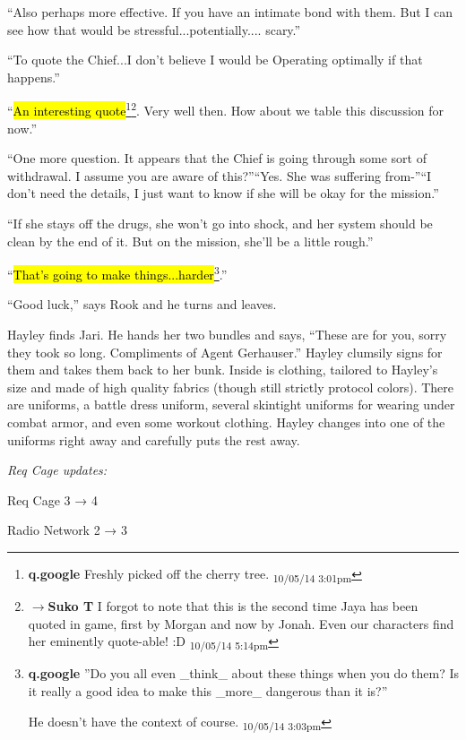 ``Also perhaps more effective.  If you have an intimate bond with them.  But I can see how that would be stressful...potentially.... scary.''

``To quote the Chief...I don't believe I would be Operating optimally if that happens.''

``\hl{An interesting quote}\footnote{\textbf{q.google }Freshly picked off the cherry tree. \textsubscript{10/05/14 3:01pm}}\footnote{$\rightarrow$\textbf{Suko T }I forgot to note that this is the second time Jaya has been quoted in game, first by Morgan and now by Jonah.  Even our characters find her eminently quote-able! :D \textsubscript{10/05/14 5:14pm}}.  Very well then.  How about we table this discussion for now.''

``One more question.  It appears that the Chief is going through some sort of withdrawal.  I assume you are aware of this?''``Yes. She was suffering from-''``I don't need the details, I just want to know if she will be okay for the mission.''

``If she stays off the drugs, she won't go into shock, and her system should be clean by the end of it.  But on the mission, she'll be a little rough.''

``\hl{That's going to make things...harder}\footnote{\textbf{q.google }''Do you all even \_think\_ about these things when you do them?  Is it really a good idea to make this \_more\_ dangerous than it is?''

He doesn't have the context of course. \textsubscript{10/05/14 3:03pm}}.''

``Good luck,'' says Rook and he turns and leaves.





Hayley finds Jari.  He hands her two bundles and says, ``These are for you, sorry they took so long.  Compliments of Agent Gerhauser.''  Hayley clumsily signs for them and takes them back to her bunk.  Inside is clothing, tailored to Hayley's size and made of high quality fabrics (though still strictly protocol colors).  There are uniforms, a battle dress uniform, several skintight uniforms for wearing under combat armor, and even some workout clothing.  Hayley changes into one of the uniforms right away and carefully puts the rest away.



\textit{Req Cage updates:}

Req Cage 3 → 4

Radio Network 2 →  3

